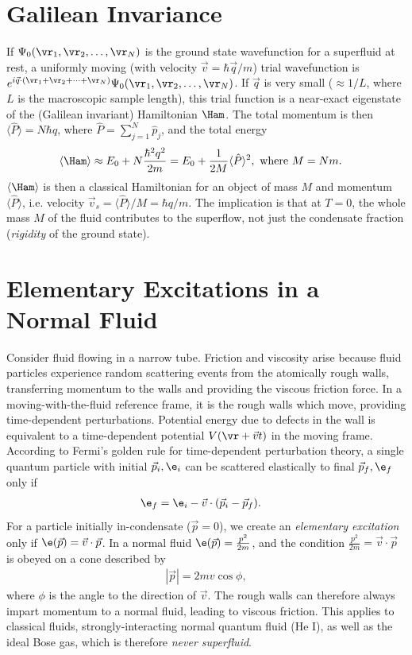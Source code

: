 \documentclass[qo.tex]{subfiles}
\begin{document}
\section{Galilean Invariance}
If $\Psi_0(\vr_1,\vr_2,\dots,\vr_N)$ is the ground state wavefunction for a superfluid at rest, a uniformly moving (with velocity $\vec{v}=\hbar\vec{q}/m$) trial wavefunction is $e^{i\vec{q}\cdot(\vr_1+\vr_2+\cdots+\vr_N)}\Psi_0(\vr_1,\vr_2,\dots,\vr_N)$.
If $\vec{q}$ is very small ($\approx 1/L$, where $L$ is the macroscopic sample length), this trial function is a near-exact eigenstate of the (Galilean invariant) Hamiltonian $\Ham$. 
The total momentum is then $\langle\hat{P}\rangle=N\hbar q$, where $\hat{P}=\sum_{j=1}^N \hat{p}_j$, and the total energy
\begin{align}
    \langle\Ham\rangle &\approx E_0 + N\frac{\hbar^2 q^2}{2m} = E_0 + \frac{1}{2M}\langle\hat{P}\rangle^2, \text{ where } M = Nm.
\end{align}
$\langle\Ham\rangle$ is then a classical Hamiltonian for an object of mass $M$ and momentum $\langle\hat{P}\rangle$, i.e. velocity $\vec{v}_s=\langle\hat{P}\rangle/M=\hbar q/m$.
The implication is that at $T=0$, the whole mass $M$ of the fluid contributes to the superflow, not just the condensate fraction (\emph{rigidity} of the ground state).

\section{Elementary Excitations in a Normal Fluid}
Consider fluid flowing in a narrow tube.
Friction and viscosity arise because fluid particles experience random scattering events from the atomically rough walls, transferring momentum to the walls and providing the viscous friction force.
In a moving-with-the-fluid reference frame, it is the rough walls which move, providing time-dependent perturbations.
Potential energy due to defects in the wall is equivalent to a time-dependent potential $V(\vr+\vec{v}t)$ in the moving frame.
According to Fermi's golden rule for time-dependent perturbation theory, a single quantum particle with initial $\vec{p}_i,\e_i$ can be scattered elastically to final $\vec{p}_f,\e_f$ only if
\begin{align}
    \e_f &= \e_i-\vec{v}\cdot(\vec{p}_i-\vec{p}_f).
\end{align}
For a particle initially in-condensate ($\vec{p}=0$), we create an \emph{elementary excitation} only if $\e(\vec{p})=\vec{v}\cdot\vec{p}$.
In a normal fluid $\e(\vec{p})=\frac{p^2}{2m}$, and the condition $\frac{p^2}{2m}=\vec{v}\cdot\vec{p}$ is obeyed on a cone described by 
\begin{align}
    |\vec{p}| = 2mv\cos\phi,
\end{align}
where $\phi$ is the angle to the direction of $\vec{v}$.
The rough walls can therefore always impart momentum to a normal fluid, leading to viscous friction.
This applies to classical fluids, strongly-interacting normal quantum fluid (He I), as well as the ideal Bose gas, which is therefore \emph{never superfluid}.
\end{document}
